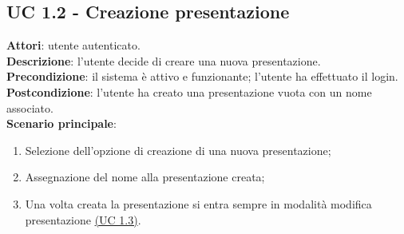 \subsection{UC 1.2 - Creazione presentazione}{
	\label{uc1.2}
	\textbf{Attori}: utente autenticato.	\\
	\textbf{Descrizione}: l'utente decide di creare una nuova presentazione.	\\
	\textbf{Precondizione}: il sistema è attivo e funzionante; l'utente ha effettuato il login.	\\
	\textbf{Postcondizione}: l'utente ha creato una presentazione vuota con un nome associato.	\\
	\textbf{Scenario principale}:
	\begin{enumerate}
		\item Selezione dell'opzione di creazione di una nuova presentazione;
		\item Assegnazione del nome alla presentazione creata;
		\item Una volta creata la presentazione si entra sempre in modalità modifica presentazione \hyperref[uc1.3]{(UC 1.3)}.
	\end{enumerate}
	}
